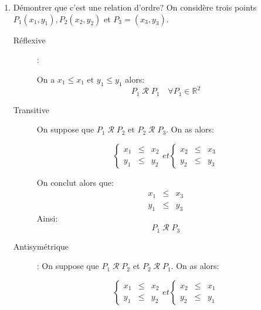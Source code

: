 \documentclass[12pt,a4paper,dvipsnames]{article}
\begin{document}
\begin{enumerate}
    \item Démontrer que c'est une relation d'ordre?
    On considère trois points $P_1(x_1, y_1), P_2(x_2, y_2)$ et $P_3=(x_3,y_3)$.
\begin{description}
    \item[Réflexive]:

        On a $ x_1 \leq x_1 \text{ et } y_1\leq y_1$ alors:
        $$  
        P_1 \;\mathcal{R}\; P_1 \quad \forall P_1\in \mathbb{R}^2
        $$

    \item[Transitive]
        On suppose que $P_1\;\mathcal{R}\; P_2$ et $P_2\;\mathcal{R}\; P_3$. On
        as alors:

        \begin{equation}
            \left\{\begin{array}{lll} x_1&\leq & x_2\\
            y_1&\leq&y_2\end{array}\right. et \left\{
\begin{array}{lll} x_2&\leq & x_3\\
            y_2&\leq&y_3\end{array}
        \right.
        \end{equation}

        On conclut alors que:
        \begin{equation}
            \begin{array}{lll} x_1&\leq & x_3\\
            y_1&\leq&y_3\end{array}
        \end{equation}
        Ainsi:
        \begin{equation}
            P_1\; \mathcal{R}\; P_3
        \end{equation}
    \item[Antisymétrique]:
        On suppose que $P_1\;\mathcal{R}\; P_2$ et $P_2\;\mathcal{R}\; P_1$. On
        as alors:

        \begin{equation}
            \left\{\begin{array}{lll} x_1&\leq & x_2\\
            y_1&\leq&y_2\end{array}\right. et \left\{
\begin{array}{lll} x_2&\leq & x_1\\
            y_2&\leq&y_1\end{array}
        \right.
        \end{equation}


\end{description}
\end{enumerate}
\end{document}
